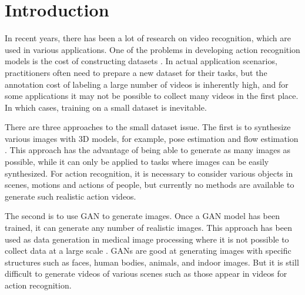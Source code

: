 





\section{Introduction}




In recent years, there has been a lot of research on video recognition, which are used in various applications.
One of the problems in developing action recognition models is the cost of constructing datasets
\cite{DBLP:ucf101,DBLP:journals/corr/Kinetics,wishart2018hmdb}. 
In actual application scenarios, 
practitioners often need to prepare a new dataset for their tasks, but
the annotation cost of labeling a large number of videos is inherently high,
and for some applications it may not be possible to collect many videos in the first place.
In which cases, training on a small dataset is inevitable.


There are three approaches to the small dataset issue.
The first is to synthesize various images with 3D models,
for example, pose estimation \cite{varol17_surreal}
and flow estimation \cite{Sintel,FlyingChairs,Flyingthings3D}.
This approach has the advantage of being able to generate as many images as possible,
while it can only be applied to tasks where images can be easily synthesized.
For action recognition, it is necessary to consider various objects in scenes, motions and actions of people,
but currently no methods are available to generate such realistic action videos.


The second is to use GAN \cite{GAN,9528943} to generate images.
Once a GAN model has been trained,
it can generate any number of realistic images.
This approach has been used as data generation in medical image processing 
where it is not possible to collect data at a large scale \cite{cGAN_Medical,SA-GAN_CT}.
GANs are good at generating images with specific structures 
such as faces, human bodies, animals, and indoor images.
But it is still difficult to generate videos of various scenes \cite{GAN_video,MocoGAN}
such as those appear in videos for action recognition.


